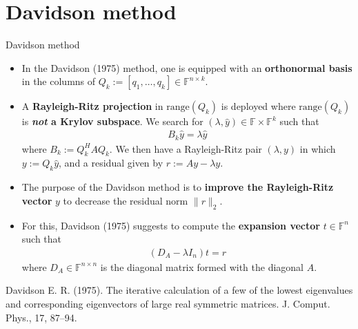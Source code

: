 \documentclass[t,usepdftitle=false]{beamer}
\begin{document}
\section{Davidson method}	
	
\begin{frame}{Davidson method}
\begin{itemize}
\item In the Davidson (1975) method, one is equipped with an \textbf{orthonormal basis} in the columns of $Q_k:=[q_1,\dots,q_k]\in\mathbb{F}^{n\times k}$.
\item[] A \textbf{Rayleigh-Ritz projection} in $\text{range}(Q_k)$ is deployed where $\text{range}(Q_k)$ is \textbf{\textit{not} a Krylov subspace}.
We search for $(\lambda,\hat{y})\in\mathbb{F}\times\mathbb{F}^k$ such that
\begin{align*}
B_k\hat{y}=\lambda\hat{y}
\end{align*}
where $B_k:=Q_k^HAQ_k$.
We then have a Rayleigh-Ritz pair $(\lambda,y)$ in which $y:=Q_k\hat{y}$, and a residual given by $r:=Ay-\lambda y$.
\item The purpose of the Davidson method is to \textbf{improve the Rayleigh-Ritz vector} $y$ to decrease the residual norm $\|r\|_2$.
\item[] For this, Davidson (1975) suggests to compute the \textbf{expansion vector} $t\in\mathbb{F}^n$ such that
\begin{align*}
(D_A-\lambda I_n)t=r
\end{align*}
where $D_A\in\mathbb{F}^{n\times n}$ is the diagonal matrix formed with the diagonal $A$.
\end{itemize}\smallskip
\tiny{Davidson E. R. (1975). The iterative calculation of a few of the lowest eigenvalues and corresponding eigenvectors of large real symmetric matrices. J. Comput. Phys., 17, 87–94.}
\end{frame}
\end{document}

